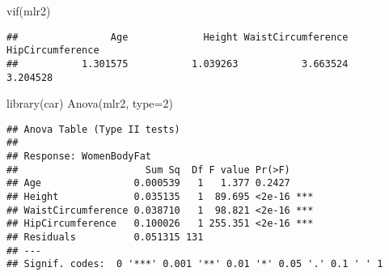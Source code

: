 \documentclass[
]{article}
\newenvironment{Shaded}{\begin{snugshade}}{\end{snugshade}}
\newcommand{\AttributeTok}[1]{\textcolor[rgb]{0.77,0.63,0.00}{#1}}
\newcommand{\DecValTok}[1]{\textcolor[rgb]{0.00,0.00,0.81}{#1}}
\newcommand{\FunctionTok}[1]{\textcolor[rgb]{0.00,0.00,0.00}{#1}}
\newcommand{\NormalTok}[1]{#1}
\begin{document}
\begin{Shaded}
\begin{Highlighting}[]
\FunctionTok{vif}\NormalTok{(mlr2)}
\end{Highlighting}
\end{Shaded}

\begin{verbatim}
##                Age             Height WaistCircumference   HipCircumference 
##           1.301575           1.039263           3.663524           3.204528
\end{verbatim}

\begin{Shaded}
\begin{Highlighting}[]
\FunctionTok{library}\NormalTok{(car)}
\FunctionTok{Anova}\NormalTok{(mlr2, }\AttributeTok{type=}\DecValTok{2}\NormalTok{)}
\end{Highlighting}
\end{Shaded}

\begin{verbatim}
## Anova Table (Type II tests)
## 
## Response: WomenBodyFat
##                      Sum Sq  Df F value Pr(>F)    
## Age                0.000539   1   1.377 0.2427    
## Height             0.035135   1  89.695 <2e-16 ***
## WaistCircumference 0.038710   1  98.821 <2e-16 ***
## HipCircumference   0.100026   1 255.351 <2e-16 ***
## Residuals          0.051315 131                   
## ---
## Signif. codes:  0 '***' 0.001 '**' 0.01 '*' 0.05 '.' 0.1 ' ' 1
\end{verbatim}
\end{document}

